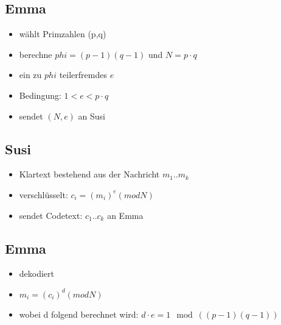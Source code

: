 
\subsection{Emma}
\label{sec:emma}

\begin{itemize}
\item wählt Primzahlen (p,q)
\item berechne $phi = (p-1)(q-1)$ und $N = p \cdot q$
\item ein zu $phi$ teilerfremdes $e$
\item Bedingung: $1 < e < p\cdot q$
\item sendet $(N, e)$ an Susi
\end{itemize}

\subsection{Susi}
\begin{itemize}
\item Klartext bestehend aus der Nachricht $m_{1}..m_{k}$
\item verschlüsselt: $c_{i} = (m_{i})^{e} (mod N)$
\item sendet Codetext:  $c_{1}..c_{k}$ an Emma
\end{itemize}

\subsection{Emma}
\begin{itemize}
\item dekodiert
\item $m_{i} = (c_{i})^{d} (mod N)$
\item wobei d folgend berechnet wird: $d \cdot e = 1 \mod ((p-1)(q-1))$
\end{itemize}